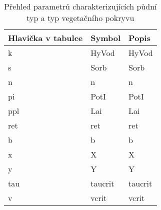 \begin{table}%
  \centering
  \caption{Přehled parametrů charakterizujících půdní typ a typ vegetačního pokryvu}
  {\small
    \begin{tabular}{p{1.5cm}lp{4cm}}
    \hline
    Hlavička v tabulce & Symbol & Popis \\
    \hline \hline
    k&\acs{HyVod}  & \acl{HyVod} \\
    s&\acs{Sorb}   & \acl{Sorb} \\
    n&\acs{n}      & \acl{n}\\
    pi&\acs{PotI}   & \acl{PotI}\\
    ppl&\acs{Lai}    & \acl{Lai} \\
    ret&\acs{ret}    & \acl{ret} \\
    b&\acs{b}      & \acl{b} \\
    x&\acs{X}      & \acl{X} \\
    y&\acs{Y}      & \acl{Y} \\
    tau&\acs{taucrit}& \acl{taucrit} \\
    v&\acs{vcrit}  & \acl{vcrit} \\
    \hline
    \end{tabular}%
  }
  \label{tab:soilveg}%
\end{table}%